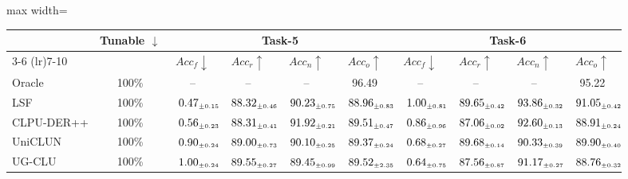 \begin{table}[!htbp]
\begin{adjustbox}{max width=\textwidth}
\begin{tabular}{l|c|cccc|cccc}
\midrule
\addlinespace[0.05cm]
\midrule
\multirow{2}{*}{\textbf{Method}} & \multirow{2}{*}{\textbf{Tunable} $\downarrow$}
& \multicolumn{4}{c|}{\textbf{Task-5}} & \multicolumn{4}{c}{\textbf{Task-6}} \\
\cmidrule(lr){3-6} \cmidrule(lr){7-10}
& & $Acc_f \downarrow$ & $Acc_r \uparrow$ & $Acc_n \uparrow$ & $Acc_o \uparrow$
& $Acc_f \downarrow$ & $Acc_r \uparrow$ & $Acc_n \uparrow$ & $Acc_o \uparrow$ \\
\midrule
Oracle        & 100\% & -- & -- & -- & 96.49 & -- & -- & -- & 95.22 \\
\midrule
LSF & 100\% & $\kern6pt0.47_{\scriptscriptstyle \pm 0.15}\kern-6pt$ & $\kern6pt88.32_{\scriptscriptstyle \pm 0.46}\kern-6pt$ & $\kern6pt90.23_{\scriptscriptstyle \pm 0.75}\kern-6pt$ & $\kern6pt88.96_{\scriptscriptstyle \pm 0.83}\kern-6pt$ & $\kern6pt1.00_{\scriptscriptstyle \pm 0.81}\kern-6pt$ & $\kern6pt89.65_{\scriptscriptstyle \pm 0.42}\kern-6pt$ & \colorbox{green!25}{$\kern6pt93.86_{\scriptscriptstyle \pm 0.32}\kern-6pt$} & \colorbox{yellow!35}{$\kern6pt91.05_{\scriptscriptstyle \pm 0.42}\kern-6pt$} \\
CLPU-DER++ & 100\% & $\kern6pt0.56_{\scriptscriptstyle \pm 0.23}\kern-6pt$ & $\kern6pt88.31_{\scriptscriptstyle \pm 0.41}\kern-6pt$ & $\kern6pt91.92_{\scriptscriptstyle \pm 0.21}\kern-6pt$ & $\kern6pt89.51_{\scriptscriptstyle \pm 0.47}\kern-6pt$ & $\kern6pt0.86_{\scriptscriptstyle \pm 0.96}\kern-6pt$ & $\kern6pt87.06_{\scriptscriptstyle \pm 0.02}\kern-6pt$ & $\kern6pt92.60_{\scriptscriptstyle \pm 0.13}\kern-6pt$ & $\kern6pt88.91_{\scriptscriptstyle \pm 0.24}\kern-6pt$ \\
UniCLUN & 100\% & $\kern6pt0.90_{\scriptscriptstyle \pm 0.24}\kern-6pt$ & $\kern6pt89.00_{\scriptscriptstyle \pm 0.73}\kern-6pt$ & $\kern6pt90.10_{\scriptscriptstyle \pm 0.25}\kern-6pt$ & $\kern6pt89.37_{\scriptscriptstyle \pm 0.24}\kern-6pt$ & $\kern6pt0.68_{\scriptscriptstyle \pm 0.27}\kern-6pt$ & \colorbox{yellow!35}{$\kern6pt89.68_{\scriptscriptstyle \pm 0.14}\kern-6pt$} & $\kern6pt90.33_{\scriptscriptstyle \pm 0.39}\kern-6pt$ & $\kern6pt89.90_{\scriptscriptstyle \pm 0.40}\kern-6pt$ \\
UG-CLU & 100\% & $\kern6pt1.00_{\scriptscriptstyle \pm 0.24}\kern-6pt$ & \colorbox{yellow!35}{$\kern6pt89.55_{\scriptscriptstyle \pm 0.27}\kern-6pt$} & $\kern6pt89.45_{\scriptscriptstyle \pm 0.99}\kern-6pt$ & \colorbox{yellow!35}{$\kern6pt89.52_{\scriptscriptstyle \pm 2.35}\kern-6pt$} & $\kern6pt0.64_{\scriptscriptstyle \pm 0.75}\kern-6pt$ & $\kern6pt87.56_{\scriptscriptstyle \pm 0.87}\kern-6pt$ & $\kern6pt91.17_{\scriptscriptstyle \pm 0.27}\kern-6pt$ & $\kern6pt88.76_{\scriptscriptstyle \pm 0.32}\kern-6pt$ \\

\end{tabular}
\end{adjustbox}
\end{table}
